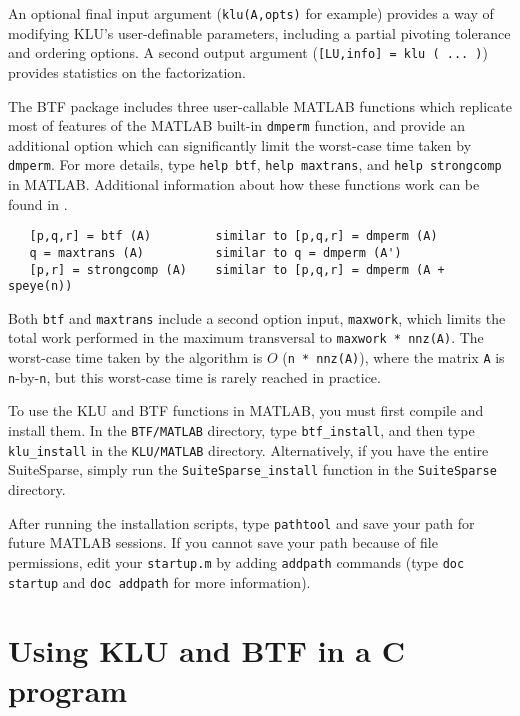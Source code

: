 \documentclass[11pt]{article}
\begin{document}
An optional final input argument ({\tt klu(A,opts)} for example) provides a
way of modifying KLU's user-definable parameters, including a partial pivoting
tolerance and ordering options.  A second output argument
({\tt [LU,info] = klu ( ... )}) provides statistics on the factorization.

The BTF package includes three user-callable MATLAB functions which replicate
most of features of the MATLAB built-in {\tt dmperm} function, and provide an
additional option which can significantly limit the worst-case time taken by
{\tt dmperm}.  For more details, type {\tt help btf}, {\tt help maxtrans},
and {\tt help strongcomp} in MATLAB.  Additional information about how
these functions work can be found in \cite{Davis06book}.

{\footnotesize
\begin{verbatim}
   [p,q,r] = btf (A)         similar to [p,q,r] = dmperm (A)
   q = maxtrans (A)          similar to q = dmperm (A')
   [p,r] = strongcomp (A)    similar to [p,q,r] = dmperm (A + speye(n))
\end{verbatim}
}

Both {\tt btf} and {\tt maxtrans} include a second option input, {\tt maxwork},
which limits the total work performed in the maximum transversal to
{\tt maxwork * nnz(A)}.  The worst-case time taken by the algorithm is
$O$ ({\tt n * nnz(A)}), where the matrix {\tt A} is {\tt n}-by-{\tt n}, but
this worst-case time is rarely reached in practice.

To use the KLU and BTF functions in MATLAB, you must first compile and install
them.  In the {\tt BTF/MATLAB} directory, type {\tt btf\_install}, and then
type {\tt klu\_install} in the {\tt KLU/MATLAB} directory.  Alternatively, if
you have the entire SuiteSparse, simply run the {\tt SuiteSparse\_install}
function in the {\tt SuiteSparse} directory.

After running the installation scripts, type {\tt pathtool} and save your path
for future MATLAB sessions.  If you cannot save your path because of file
permissions, edit your {\tt startup.m} by adding {\tt addpath} commands (type
{\tt doc startup} and {\tt doc addpath} for more information).

\section{Using KLU and BTF in a C program}
\label{Cversion}
\end{document}
